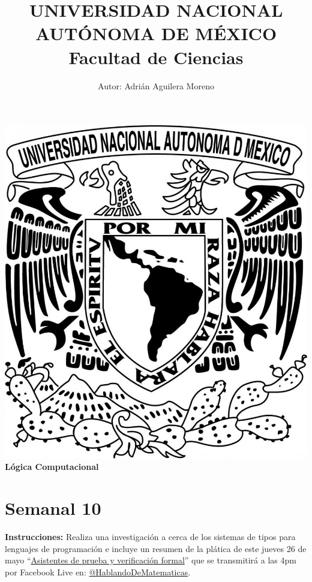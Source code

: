 \documentclass{article}
\begin{document}
\title{UNIVERSIDAD NACIONAL AUT\'ONOMA DE M\'EXICO\\ Facultad de Ciencias}
\author{Autor: Adri\'an Aguilera Moreno}

\date{}
\maketitle
\begin{center}
  \includegraphics[scale=0.20]{../Imagen/Portada.jpg}\\[0.4cm]
  \Large
  \bf{Lógica Computacional}
  \normalsize
\end{center}
\newpage
{}
\section*{\LARGE{Semanal 10}}
\textbf{Instrucciones:} Realiza una investigación a cerca de los sistemas de tipos para lenguajes de programación
e incluye un resumen de la plática de este jueves 26 de mayo
``\href{https://www.facebook.com/HablandoDeMatematicas/videos/585456159435284/}{Asistentes de prueba y verificación formal}''
que se transmitirá a las 4pm por Facebook Live en: \href{https://www.facebook.com/HablandoDeMatematicas}{@HablandoDeMatematicas}.
\end{document}

